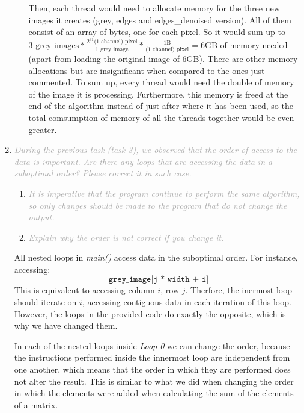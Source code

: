 \documentclass{article}
\newcommand{\greyItem}[1]{\item\emph{\textcolor{darkgray}{#1}}}
\begin{document}
\begin{enumerate}[label=5.\arabic*,leftmargin=*]
\begin{enumerate}
        Then, each thread would need to allocate memory for the three new images it creates (grey, edges and edges\_denoised version). All of them consist of an array of bytes, one for each pixel. So it would sum up to $3\text{ grey images}*\frac{2^{31}\text{(1 channel) pixel}}{\text{1 grey image}}*\frac{1\text{B}}{\text{(1 channel) pixel}}= 6 \text{GB}$ of memory needed (apart from loading the original image of 6GB). There are other memory allocations but are insignificant when compared to the ones just commented. To sum up, every thread would need the double of memory of the image it is processing. Furthermore, this memory is freed at the end of the algorithm instead of just after where it has been used, so the total comsumption of memory of all the threads together would be even greater.
        
    \end{enumerate}

\greyItem{During the previous task (task 3), we observed that the order of access to the data is important. Are there any loops that are accessing the data in a suboptimal order? Please correct it in such case.}


\begin{enumerate}
        \greyItem{It is imperative that the program continue to perform the same algorithm, so only changes should be made to the program that do not change the output.}
            
        \greyItem{Explain why the order is not correct if you change it.}
    \end{enumerate}
    
All nested loops in \emph{main()} access data in the suboptimal order. For instance, accessing: 
\begin{equation}\label{array}
    \texttt{grey\_image[j * width + i]}
\end{equation}
This is equivalent to accessing column $i$, row $j$. Therfore, the inermost loop should iterate on $i$, accessing contiguous data in each iteration of this loop. However, the loops in the provided code do exactly the opposite, which is why we have changed them. 

In each of the nested loops inside \emph{Loop 0} we can change the order, because the instructions performed inside the innermost loop are independent from one another, which means that the order in which they are performed does not alter the result. This is similar to what we did when changing the order in which the elements were added when calculating the sum of the elements of a matrix.


\end{enumerate}
\end{document}
